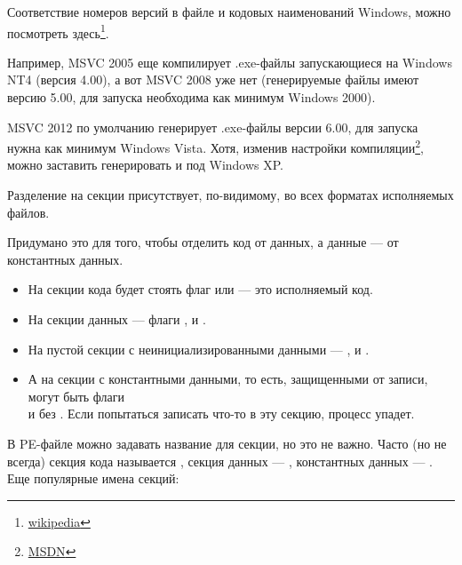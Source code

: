 Соответствие номеров версий в файле и кодовых наименований Windows, можно посмотреть
здесь\footnote{\href{http://go.yurichev.com/17044}{wikipedia}}.

Например, \ac{MSVC} 2005 еще компилирует .exe-файлы запускающиеся на Windows NT4 (версия 4.00), а вот \ac{MSVC} 2008 уже нет 
(генерируемые файлы имеют версию 5.00, для запуска необходима как минимум Windows 2000).

\ac{MSVC} 2012 по умолчанию генерирует .exe-файлы версии 6.00, для запуска нужна как минимум Windows Vista. 
Хотя, изменив настройки компиляции\footnote{\href{http://go.yurichev.com/17045}{MSDN}},
можно заставить генерировать и под Windows XP.


Разделение на секции присутствует, по-видимому, во всех форматах исполняемых файлов.

Придумано это для того, чтобы отделить код от данных, а данные --- от константных данных.


\begin{itemize}
\item На секции кода будет стоять флаг  или  --- это исполняемый код.

\item На секции данных --- флаги , 
 и .

\item На пустой секции с неинициализированными данными --- ,  и .

\item А на секции с константными данными, то есть, защищенными от записи, могут быть флаги \\
 и  без . 
Если попытаться записать что-то в эту секцию, процесс упадет.
\end{itemize}

В PE-файле можно задавать название для секции, но это не важно.
Часто (но не всегда) секция кода называется , секция данных --- , константных данных ---  .
Еще популярные имена секций: 

